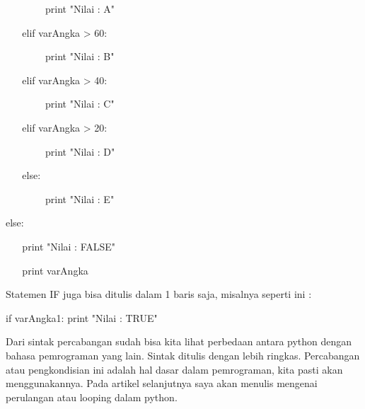 \vspace{12pt}
\noindent 
 $  $  $  $  $  $  $  $  $  $  $  $  $  $  $  $  $  $  $  $  $  $  $  $ print "Nilai : A" \par
\vspace{12pt}
\noindent 
 $  $  $  $  $  $  $  $  $  $  $  $elif varAngka > 60: \par
\vspace{12pt}
\noindent 
 $  $  $  $  $  $  $  $  $  $  $  $  $  $  $  $  $  $  $  $  $  $  $  $ print "Nilai : B" \par
\vspace{12pt}
\noindent 
 $  $  $  $  $  $  $  $  $  $  $  $elif varAngka > 40: \par
\vspace{12pt}
\noindent 
 $  $  $  $  $  $  $  $  $  $  $  $  $  $  $  $  $  $  $  $  $  $  $  $ print "Nilai : C" \par
\vspace{12pt}
\noindent 
 $  $  $  $  $  $  $  $  $  $  $  $elif varAngka > 20: \par
\vspace{12pt}
\noindent 
 $  $  $  $  $  $  $  $  $  $  $  $  $  $  $  $  $  $  $  $  $  $  $  $ print "Nilai : D" \par
\vspace{12pt}
\noindent 
 $  $  $  $  $  $  $  $  $  $  $  $else: \par
\vspace{12pt}
\noindent 
 $  $  $  $  $  $  $  $  $  $  $  $  $  $  $  $  $  $  $  $  $  $  $  $ print "Nilai : E" \par
\vspace{12pt}
\noindent 
else: \par
\vspace{12pt}
\noindent 
 $  $  $  $  $  $  $  $  $  $  $  $print "Nilai : FALSE" \par
\vspace{12pt}
\noindent 
 $  $  $  $  $  $  $  $  $  $  $  $print varAngka \par
\vspace{12pt}
\noindent 
Statemen IF juga bisa ditulis dalam 1 baris saja, misalnya seperti ini :  \par
\vspace{12pt}
\noindent 
if varAngka1: print "Nilai : TRUE" \par
\vspace{12pt}
\noindent 
Dari sintak percabangan sudah bisa kita lihat perbedaan antara python dengan bahasa pemrograman yang lain. Sintak ditulis dengan lebih ringkas. Percabangan atau pengkondisian ini adalah hal dasar dalam pemrograman, kita pasti akan menggunakannya. Pada artikel selanjutnya saya akan menulis mengenai perulangan atau looping dalam python. \par
